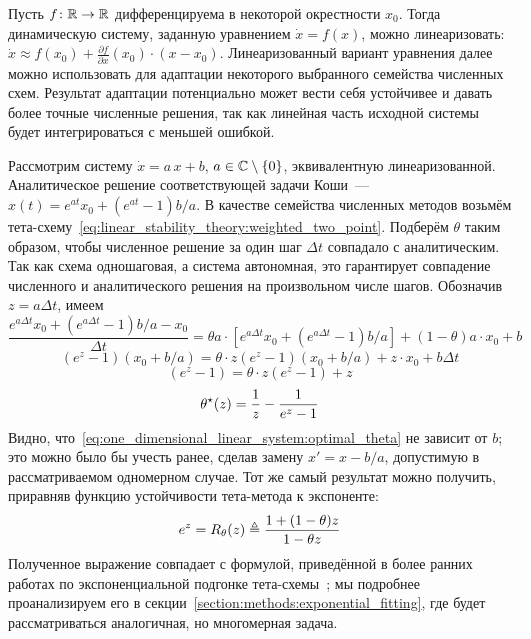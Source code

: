 Пусть $ f \colon \mathbb{R} \to \mathbb{R} $ дифференцируема в некоторой окрестности $ x_0 $.
Тогда динамическую систему, заданную уравнением $ \dot x = f(x) $,
можно линеаризовать: $ \dot x \approx f(x_0) + \frac{\partial f}{\partial x}(x_0) \cdot (x - x_0) $.
Линеаризованный вариант уравнения далее можно использовать для адаптации некоторого выбранного семейства численных схем.
Результат адаптации потенциально может вести себя устойчивее и давать более точные численные решения,
так как линейная часть исходной системы будет интегрироваться с меньшей ошибкой.

Рассмотрим систему $ \dot x = a \, x + b $, $ a \in \mathbb{C} \setminus \{ 0 \} $,
эквивалентную линеаризованной.
Аналитическое решение соответствующей задачи Коши~--- $ x(t) = e^{a t} x_0 + (e^{a t} - 1) b / a $.
В качестве семейства численных методов возьмём тета-схему~\eqref{eq:linear_stability_theory:weighted_two_point}.
%
%
Подберём $ \theta $ таким образом,
чтобы численное решение за один шаг $ \Delta t $ совпадало с аналитическим.
Так как схема одношаговая, а система автономная,
это гарантирует совпадение численного и аналитического решения на произвольном числе шагов.
Обозначив $ z = a \Delta t $, имеем
\[
    \frac{e^{a \Delta t} x_0 + (e^{a \Delta t} - 1) b / a - x_0}{\Delta t} = \theta a \cdot \left[ e^{a \Delta t} x_0 + (e^{a \Delta t} - 1) b / a \right] + (1 - \theta) a \cdot x_0 + b
\]
\[
    (e^{z} - 1)(x_0 + b / a) = \theta \cdot z (e^{z} - 1)(x_0 + b / a) + z \cdot x_0 + b \Delta t
\]
\[
    (e^{z} - 1) = \theta \cdot z (e^{z} - 1) + z
\]
%
\begin{equation}
    \label{eq:one_dimensional_linear_system:optimal_theta}
    \theta^\star(z) = \frac{1}{z} - \frac{1}{e^{z} - 1}
\end{equation}
%
Видно, что~\eqref{eq:one_dimensional_linear_system:optimal_theta} не зависит от $ b $;
это можно было бы учесть ранее, сделав замену $ x' = x - b/a $,
допустимую в рассматриваемом одномерном случае.
Тот же самый результат можно получить, приравняв функцию устойчивости тета-метода к экспоненте:
\[
    e^z = R_\theta(z) \triangleq \frac{1 + (1 - \theta) z}{1 - \theta z}
\]
Полученное выражение совпадает с формулой, приведённой в более ранних работах по
экспоненциальной подгонке тета-схемы~\cite{liniger1970efficient_integration_methods, lambert1991methods, berzins1992adaptive_theta_method};
мы подробнее проанализируем его в секции~\ref{section:methods:exponential_fitting},
где будет рассматриваться аналогичная,
но многомерная задача.

